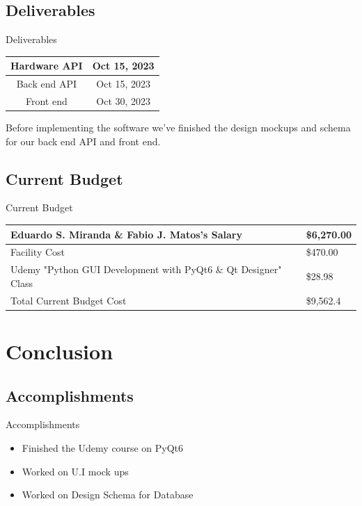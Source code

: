 \documentclass[17pt, aspectratio=169]{beamer}
\begin{document}
\subsection*{Deliverables}
\begin{frame}{Deliverables}
	\begin{center}
		\begin{tabular}{||c | c||}
			\hline
			Hardware API & Oct 15, 2023 \\
			\hline
			Back end API & Oct 15, 2023 \\
			\hline
			Front end    & Oct 30, 2023 \\
			\hline
		\end{tabular}
	\end{center}
	Before implementing the software we've finished the design mockups and schema for our back end API and front end.
\end{frame}
\subsection*{Current Budget}
\begin{frame}{Current Budget}
	\begin{center}
		\begin{tabular}{||m{} | m{} ||}
			\hline
			Eduardo S. Miranda \& Fabio J. Matos's Salary                  & \$6,270.00 \\
			\hline
			Facility Cost                                                  & \$470.00   \\
			\hline
			Udemy "Python GUI Development with PyQt6 \& Qt Designer" Class & \$28.98    \\
			\hline
			Total Current Budget Cost                                      & \$9,562.4  \\
			\hline
		\end{tabular}
	\end{center}
\end{frame}
\section{Conclusion}
\subsection{Accomplishments}
\begin{frame}{Accomplishments}
	\begin{itemize}
		\item Finished the Udemy course on PyQt6
		\item Worked on U.I mock ups
		\item Worked on Design Schema for Database
	\end{itemize}
\end{frame}
\end{document}
